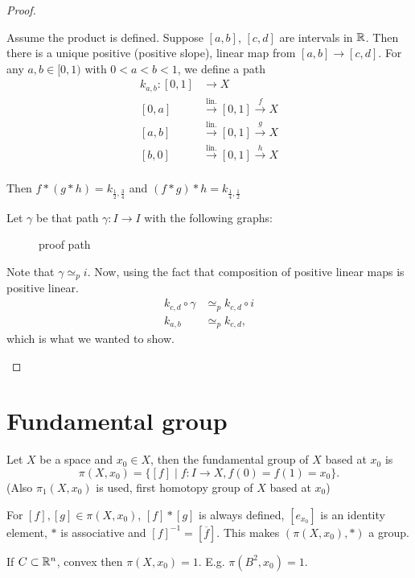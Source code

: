 \begin{proof}
\begin{itemize}
            Assume the product is defined.
            Suppose $[a, b]$,  $[c, d]$ are intervals in  $\mathbb{R}$.
            Then there is a unique positive (positive slope), linear map from $[a, b] \to [c,d]$.
            For any $a, b \in [0, 1)$ with $ 0<a<b<1$, we define a path
            \begin{align*}
                k_{a,b}: [0, 1] &\longrightarrow  X\\
                [0, a] & \xrightarrow{\text{lin.}}[0, 1] \xrightarrow{f}  X\\
                [a, b] & \xrightarrow{\text{lin.}}[0, 1] \xrightarrow{g}  X\\
                [b, 0] & \xrightarrow{\text{lin.}}[0, 1] \xrightarrow{h}  X\\
            \end{align*} 

            Then $f*(g*h) = k_{\frac{1}{2}, \frac{3}{4}}$ and $(f*g)*h = k_{\frac{1}{4}, \frac{1}{2}}$

            Let $\gamma$ be that path $\gamma:I \to  I$ with the following graphs:

            \begin{figure}[H]
                \centering
                \caption{proof path}
                \label{fig:proof-path}
            \end{figure}
            Note  that $\gamma \simeq_p i$.
            Now, using the fact that composition of positive linear maps is positive linear.
            \begin{align*}
                k_{c, d}  \circ  \gamma &\simeq_p  k_{c, d}  \circ i\\
                k_{a, b} &\simeq_p  k_{c, d},
            \end{align*} 
            which is what we wanted to show.
    \end{itemize}
\end{proof}


\section{Fundamental group}
\begin{definition}
    Let $X$ be a space and $x_0 \in X$, then the fundamental group of $X$ based at $x_0$ is
    \[
        \pi(X, x_0) = \{ [f]  \mid  f : I \to X, f(0) = f(1) = x_0\} 
    .\] 
    (Also $\pi_1(X, x_0)$ is used, first homotopy group of $X$ based at $x_0$)

    For $[f], [g] \in \pi(X, x_0)$, $[f] * [g]$ is always defined,  $[e_{x_0}]$ is an identity element, $*$ is associative and $[f]^{-1} = [\overline{f}]$. This makes $(\pi(X, x_0), *)$ a group.
\end{definition}
\begin{eg}
    If $C \subset \mathbb{R}^n$, convex then $\pi(X, x_0) = 1$.
    E.g. $\pi(B^2, x_0) = 1$.
\end{eg}

